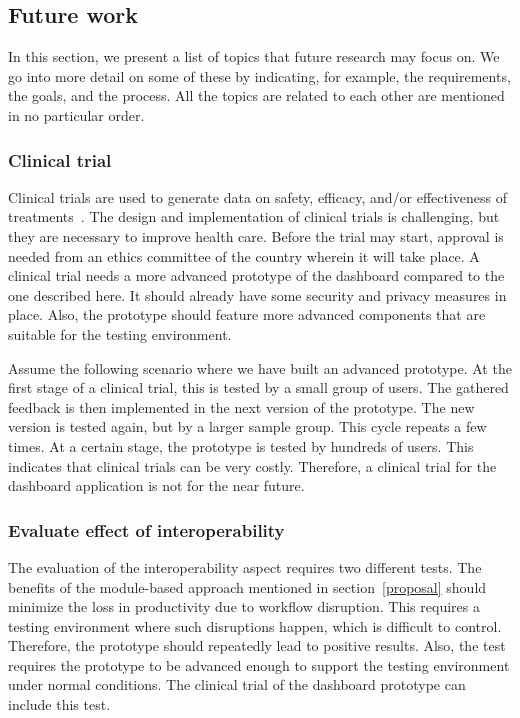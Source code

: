     \subsection{Future work}\label{future_work}

    In this section, we present a list of topics that future research may focus on. We go into more detail on some of these by indicating, for example, the requirements, the goals, and the process. All the topics are related to each other are mentioned in no particular order.

    \subsubsection{Clinical trial}

    Clinical trials are used to generate data on safety, efficacy, and/or effectiveness of treatments~\cite{Minneci2018}. The design and implementation of clinical trials is challenging, but they are necessary to improve health care. Before the trial may start, approval is needed from an ethics committee of the country wherein it will take place. A clinical trial needs a more advanced prototype of the dashboard compared to the one described here. It should already have some security and privacy measures in place. Also, the prototype should feature more advanced components that are suitable for the testing environment.

    Assume the following scenario where we have built an advanced prototype. At the first stage of a clinical trial, this is tested by a small group of users. The gathered feedback is then implemented in the next version of the prototype. The new version is tested again, but by a larger sample group. This cycle repeats a few times. At a certain stage, the prototype is tested by hundreds of users. This indicates that clinical trials can be very costly. Therefore, a clinical trial for the dashboard application is not for the near future.

    \subsubsection{Evaluate effect of interoperability}

    The evaluation of the interoperability aspect requires two different tests. The benefits of the module-based approach mentioned in section~\ref{proposal} should minimize the loss in productivity due to workflow disruption. This requires a testing environment where such disruptions happen, which is difficult to control. Therefore, the prototype should repeatedly lead to positive results. Also, the test requires the prototype to be advanced enough to support the testing environment under normal conditions. The clinical trial of the dashboard prototype can include this test.

